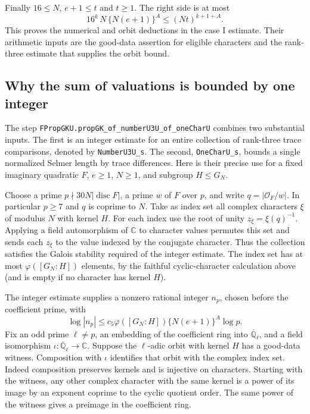 Finally \(16\le N\), \(e+1\le t\) and \(t\ge1\).
The right side is at most
\[
            16^k\,N\,\{N(e+1)\}^A\le (Nt)^{k+1+A}.
\]
This proves the numerical and orbit deductions in the case I estimate.
Their arithmetic inputs are the good-data assertion for eligible
characters and the rank-three estimate that supplies the orbit bound.

\subsection{Why the sum of valuations is bounded by one integer}

The step \texttt{FProp\allowbreak{}GKU.\allowbreak{}prop\allowbreak{}GK\_\allowbreak{}of\_\allowbreak{}number\allowbreak{}U3\allowbreak{}U\_\allowbreak{}of\_\allowbreak{}one\allowbreak{}Char\allowbreak{}U}
combines two substantial inputs. The first is an integer estimate for
an entire collection of rank-three trace comparisons, denoted by
\texttt{Number\allowbreak{}U3\allowbreak{}U\_\allowbreak{}s}. The second, \texttt{One\allowbreak{}Char\allowbreak{}U\_\allowbreak{}s}, bounds a
single normalized Selmer length by trace differences. Here is their
precise use for a fixed imaginary quadratic \(F\), \(e\ge1\), \(N\ge1\),
and subgroup \(H\le G_N\).

Choose a prime \(p\nmid30N|\operatorname{disc}F|\), a prime \(w\)
of \(F\) over \(p\), and write \(q=|\mathcal O_F/w|\). In particular
\(p\ge7\) and \(q\) is coprime to \(N\). Take as index set all complex
characters \(\xi\) of modulus \(N\) with kernel \(H\). For each index
use the root of unity \(z_\xi=\xi(q)^{-1}\). Applying a field
automorphism of \(\mathbb C\) to character values permutes this set and
sends each \(z_\xi\) to the value indexed by the conjugate character.
Thus the collection satisfies the Galois stability required of the
integer estimate. The index set has at most \(\varphi([G_N:H])\)
elements, by the faithful cyclic-character calculation above (and is
empty if no character has kernel \(H\)).

The integer estimate supplies a nonzero rational integer \(n_p\),
chosen before the coefficient prime, with
\[
     \log |n_p|\le c_5\varphi([G_N:H])\{N(e+1)\}^{A}\log p .
\]
Fix an odd prime \(\ell\ne p\), an embedding of the coefficient ring into
\(\overline{\mathbb Q}_\ell\), and a field isomorphism
\(\iota:\overline{\mathbb Q}_\ell\longrightarrow\mathbb C\).
Suppose the \(\ell\)-adic orbit with kernel \(H\) has a good-data
witness. Composition with \(\iota\) identifies that orbit with the
complex index set. Indeed composition preserves kernels and is injective
on characters. Starting with the witness, any other complex character
with the same kernel is a power of its image by an exponent coprime to
the cyclic quotient order. The same power of the witness gives a
preimage in the coefficient ring.


